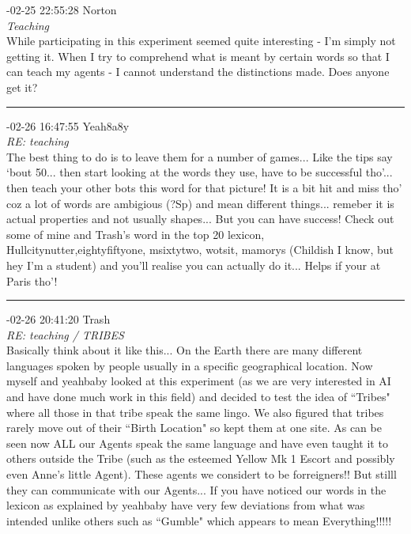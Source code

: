 \begin{mail}

{-02-25 22:55:28 Norton}\\
{\itshape Teaching}\\
While participating in this experiment seemed quite interesting - I'm simply not getting it. When I try to comprehend what is meant by certain words so that I can teach my agents - I cannot understand the distinctions made.  Does anyone get it? \\

\rule{0.8\textwidth}{.4pt}

{-02-26 16:47:55 Yeah8a8y}\\
{\itshape RE: teaching}\\
The best thing to do is to leave them for a number of games... Like the tips say `bout 50... then start looking at the words they use, have to be successful tho'... then teach your other bots this word for that picture! It is a bit hit and miss tho' coz a lot of words are ambigious (?Sp) and mean different things... remeber it is actual properties and not usually shapes... But you can have success! Check out some of mine and Trash's word in the top 20 lexicon, Hullcitynutter,eightyfiftyone, msixtytwo, wotsit, mamorys (Childish I know, but hey I'm a student) and you'll realise you can actually do it... Helps if your at Paris tho'!\\

\rule{0.8\textwidth}{.4pt}
\clearpage
{-02-26 20:41:20 Trash}\\
{\itshape RE: teaching / TRIBES}	\\
Basically think about it like this... On the Earth there are many different languages spoken by people usually in a specific geographical location. Now myself and yeahbaby looked at this experiment (as we are very interested in AI and have done much work in this field) and decided to test the idea of ``Tribes" where all those in that tribe speak the same lingo. We also figured that tribes rarely move out of their ``Birth Location" so kept them at one site. As can be seen now ALL our Agents speak the same language and have even taught it to others outside the Tribe (such as the esteemed Yellow Mk 1 Escort  and possibly even Anne's little Agent). 
These agents we considert to be forreigners!! But stilll they can communicate with our Agents... If you have noticed our words in the lexicon as explained by yeahbaby have  very few deviations from what was intended unlike others such as ``Gumble" which appears to mean Everything!!!!!


\end{mail}
